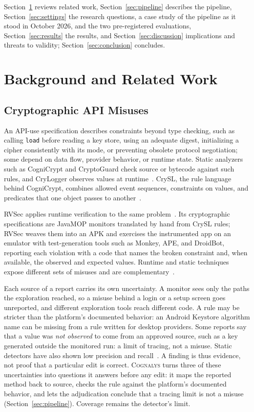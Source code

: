 \documentclass[conference]{IEEEtran}
\newcommand{\system}{\textsc{Cognalys}}
\begin{document}
Section~\ref{sec:background} reviews related work,
Section~\ref{sec:pipeline} describes the pipeline, Section~\ref{sec:settings}
the research questions, a case study of the pipeline as it stood in October
2026, and the two pre-registered evaluations, Section~\ref{sec:results} the
results, and Section~\ref{sec:discussion} implications and threats to
validity; Section~\ref{sec:conclusion} concludes.

\section{Background and Related Work}
\label{sec:background}

\subsection{Cryptographic API Misuses}

An API-use specification describes constraints beyond type checking, such as
calling \texttt{load} before reading a key store, using an adequate digest,
initializing a cipher consistently with its mode, or preventing obsolete
protocol negotiation; some depend on data flow, provider behavior, or runtime
state. Static analyzers such as CogniCrypt
and CryptoGuard check source or bytecode against such rules, and CryLogger
observes values at
runtime~\cite{krueger2017cognicrypt,rahaman2019cryptoguard,piccolboni2021crylogger}.
CrySL, the rule language behind CogniCrypt, combines allowed event sequences,
constraints on values, and predicates that one object passes to
another~\cite{krueger2021crysl}.

RVSec applies runtime verification to the same problem~\cite{torres2023runtime}.
Its cryptographic specifications are JavaMOP monitors translated by hand from
CrySL rules; RVSec weaves them into an APK and exercises the instrumented app
on an emulator with test-generation tools such as Monkey, APE, and DroidBot,
reporting each violation with a code that names the broken constraint and,
when available, the observed and expected values. Runtime and static
techniques expose different sets of misuses and are
complementary~\cite{torres2023runtime}.

Each source of a report carries its own uncertainty. A monitor sees only the
paths the exploration reached, so a misuse behind a login or a setup screen
goes unreported, and different exploration tools reach different code. A rule
may be stricter than the platform's documented behavior: an Android Keystore
algorithm name can be missing from a rule written for desktop providers. Some
reports say that a value was \emph{not observed} to come from an approved
source, such as a key generated outside the monitored run: a limit of tracing,
not a misuse. Static detectors have also shown low precision and
recall~\cite{amann2019evaluation}. A finding is thus evidence, not proof that a
particular edit is correct.
\system{} turns three of these uncertainties into questions it answers before
any edit: it maps the reported method back to source, checks the rule against
the platform's documented behavior, and lets the adjudication conclude that a
tracing limit is not a misuse (Section~\ref{sec:pipeline}). Coverage remains
the detector's limit.
\end{document}
